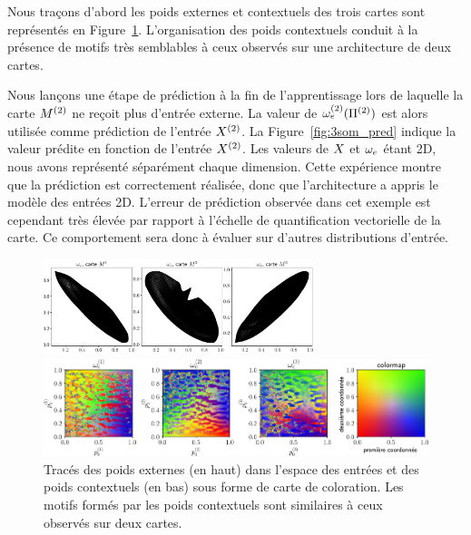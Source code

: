 \documentclass[../main]{subfiles}
\begin{document}
Nous traçons d'abord les poids externes et contextuels des trois cartes sont représentés en Figure~\ref{fig:3som_w}.
L'organisation des poids contextuels conduit à la présence de motifs très semblables à ceux observés sur une architecture de deux cartes.

Nous lançons une étape de prédiction à la fin de l'apprentissage lors de laquelle la carte $M^{({2})}$ ne reçoit plus d'entrée externe. 
La valeur de $\omega_{e}^{({2})}(\Pi^{({2})})$ est alors utilisée comme prédiction de l'entrée $X^{({2})}$.
La Figure~\ref{fig:3som_pred} indique la valeur prédite en fonction de l'entrée $X^{({2})}$. 
Les valeurs de $X$ et $\omega_e$ étant 2D, nous avons représenté séparément chaque dimension. Cette expérience montre que la prédiction est correctement réalisée, donc que l'architecture a appris le modèle des entrées 2D. 
L'erreur de prédiction observée dans cet exemple est cependant très élevée par rapport à l'échelle de quantification vectorielle de la carte. Ce comportement sera donc à évaluer sur d'autres distributions d'entrée.

\begin{figure}
	\begin{minipage}{\textwidth}
		\centering\includegraphics[width=0.7\textwidth]{3SOM_we_rc002.pdf}
	\end{minipage}
	\begin{minipage}{\textwidth}
		\includegraphics[width=\textwidth]{3SOM_S_wc_239999.pdf}
		\caption{Tracés des poids externes (en haut) dans l'espace des entrées et des poids contextuels (en bas) sous forme de carte de coloration. Les motifs formés par les poids contextuels sont similaires à ceux observés sur deux cartes. \label{fig:3som_w}}
	\end{minipage}
\end{figure}
\end{document}
